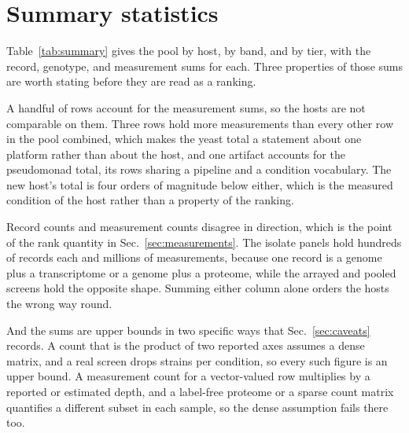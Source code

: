 
\clearpage
\section{Summary statistics}\label{sec:summary}



Table~\ref{tab:summary} gives the pool by host, by band, and by tier, with the record,
genotype, and measurement sums for each. Three properties of those sums are worth stating
before they are read as a ranking.

A handful of rows account for the measurement sums, so the hosts are not comparable on them.
Three  rows hold more measurements than every other row in the pool
combined, which makes the yeast total a statement about one platform rather than about the
host, and one artifact accounts for the pseudomonad total, its rows sharing a pipeline and a
condition vocabulary. The new host's total is four orders of magnitude below either, which is
the measured condition of the host rather than a property of the ranking.

Record counts and measurement counts disagree in direction, which is the point of the rank
quantity in Sec.~\ref{sec:measurements}. The isolate panels hold hundreds of records each and
millions of measurements, because one record is a genome plus a transcriptome or a
genome plus a proteome, while the arrayed and pooled screens hold the opposite shape. Summing
either column alone orders the hosts the wrong way round.

And the sums are upper bounds in two specific ways that Sec.~\ref{sec:caveats} records. A
count that is the product of two reported axes assumes a dense matrix, and a real screen drops
strains per condition, so every such figure is an upper bound. A measurement count for a
vector-valued row multiplies by a reported or estimated depth, and a label-free proteome or a
sparse count matrix quantifies a different subset in each sample, so the dense assumption fails
there too.

